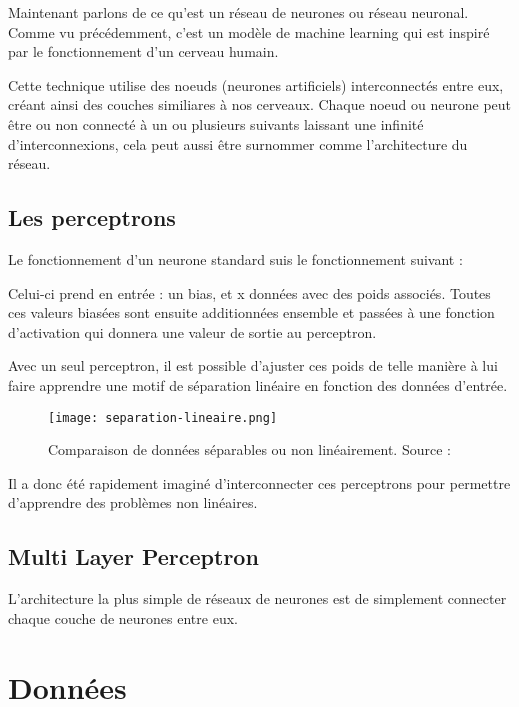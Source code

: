 Maintenant parlons de ce qu'est un réseau de neurones ou réseau neuronal.
Comme vu précédemment, c'est un modèle de machine learning qui est inspiré par le fonctionnement d'un cerveau humain.


Cette technique utilise des noeuds (neurones artificiels) interconnectés entre eux, créant ainsi des couches similiares à nos cerveaux.
Chaque noeud ou neurone peut être ou non connecté à un ou plusieurs suivants laissant une infinité d'interconnexions, 
cela peut aussi être surnommer comme l'architecture du réseau.

\subsection{Les perceptrons}

Le fonctionnement d'un neurone standard suis le fonctionnement suivant :


Celui-ci prend en entrée : un bias, et x données avec des poids associés. Toutes ces valeurs biasées sont ensuite additionnées ensemble
et passées à une fonction d'activation qui donnera une valeur de sortie au perceptron. 

Avec un seul perceptron, il est possible d'ajuster ces poids de telle manière à lui faire apprendre une motif de
séparation linéaire en fonction des données d'entrée. 

\begin{figure}[tbph!]
	\centering
	\texttt{[image: separation-lineaire.png]}
	\caption[Comparaison de données séparables ou non linéairement]{Comparaison de données séparables ou non linéairement. Source : \cite{LinearSeparation}}
\end{figure}

Il a donc été rapidement imaginé d'interconnecter ces perceptrons pour permettre d'apprendre des problèmes non linéaires.

\subsection{Multi Layer Perceptron}
L'architecture la plus simple de réseaux de neurones est de simplement connecter chaque couche de neurones entre eux.





\section{Données}




